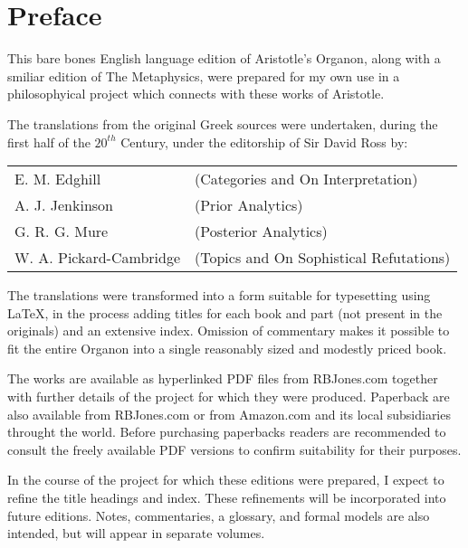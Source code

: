 \pagebreak

\chapter*{Preface}

This bare bones English language edition of Aristotle's Organon, along with a smiliar edition of The Metaphysics, were prepared for my own use in a philosophyical project which connects with these works of Aristotle.
 
The translations from the original Greek sources were undertaken, during the first half of the \ensuremath{20^{th}} Century, under the editorship of Sir David Ross by:

\vfill

\begin{centering}
\begin{tabular}{l l}
E. M. Edghill & (Categories and On Interpretation)\\
A. J. Jenkinson & (Prior Analytics)\\
G. R. G. Mure & (Posterior Analytics)\\
W. A. Pickard-Cambridge & (Topics and On Sophistical Refutations)
\end{tabular}
\end{centering}

\vfill

The translations were transformed into a form suitable for typesetting using {\LaTeX}, in the process adding titles for each book and part (not present in the originals) and an extensive index.
Omission of commentary makes it possible to fit the entire Organon into a single reasonably sized and modestly priced book.

The works are available as hyperlinked PDF files from RBJones.com together with further details of the project for which they were produced.
Paperback are also available from RBJones.com or from Amazon.com and its local subsidiaries throught the world. 
Before purchasing paperbacks readers are recommended to consult the freely available PDF versions to confirm suitability for their purposes.

In the course of the project for which these editions were prepared, I expect to refine the title headings and index.
These refinements will be incorporated into future editions.
Notes, commentaries, a glossary, and formal models are also intended, but will appear in separate volumes.

\vfill

